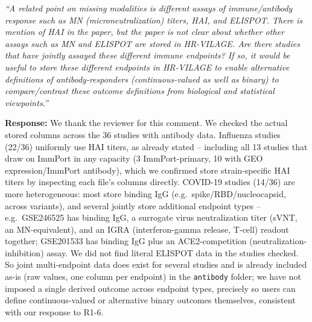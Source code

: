 \documentclass[11pt]{article}
\newcommand{\origcomment}[1]{\textit{``#1''}}
\newcommand{\filledresponse}[1]{%
  \par\medskip\noindent\textbf{Response:} #1\par
  \vspace{0.4cm}%
  \par\noindent\hrulefill\par\bigskip
}
\begin{document}
\begin{commentlist}
\item[R2-2b.] \origcomment{A related point on missing modalities is different assays of
immune/antibody response such as MN (microneutralization) titers, HAI, and ELISPOT. There is
mention of HAI in the paper, but the paper is not clear about whether other assays such as MN and
ELISPOT are stored in HR-VILAGE. Are there studies that have jointly assayed these different
immune endpoints? If so, it would be useful to store these different endpoints in HR-VILAGE to
enable alternative definitions of antibody-responders (continuous-valued as well as binary) to
compare/contrast these outcome definitions from biological and statistical viewpoints.}
\filledresponse{We thank the reviewer for this comment. We checked the actual stored columns
across the 36 studies with antibody data. Influenza studies (22/36) uniformly use HAI titers, as
already stated -- including all 13 studies that draw on ImmPort in any capacity (3 ImmPort-primary,
10 with GEO expression/ImmPort antibody), which we confirmed store strain-specific HAI titers by
inspecting each file's columns directly. COVID-19 studies (14/36) are more heterogeneous: most store binding IgG (e.g.\
spike/RBD/nucleocapsid, across variants), and several jointly store additional endpoint types --
e.g.\ GSE246525 has binding IgG, a surrogate virus neutralization titer (sVNT, an MN-equivalent),
and an IGRA (interferon-gamma release, T-cell) readout together; GSE201533 has binding IgG plus an
ACE2-competition (neutralization-inhibition) assay. We did not find literal ELISPOT data in the
studies checked. So joint multi-endpoint data does exist for several studies and is already
included as-is (raw values, one column per endpoint) in the \texttt{antibody} folder; we have not
imposed a single derived outcome across endpoint types, precisely so users can define
continuous-valued or alternative binary outcomes themselves, consistent with our response to R1-6.}


\end{commentlist}
\end{document}
